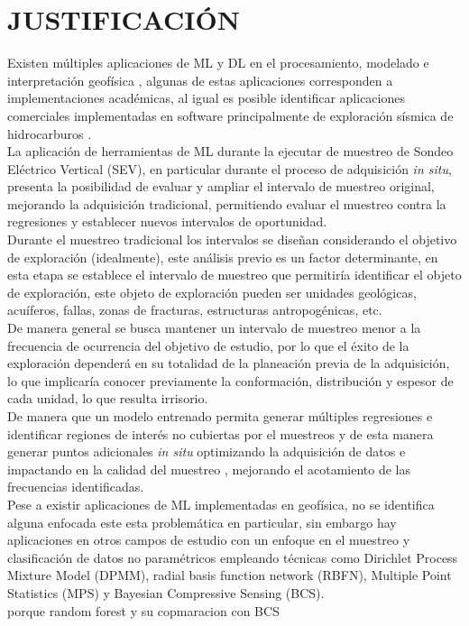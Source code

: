 \chapter{JUSTIFICACIÓN}
Existen múltiples aplicaciones de ML y DL en el procesamiento, modelado e interpretación geofísica \citep{li2024, liu2020,el2001,wrona2018}, algunas de estas aplicaciones corresponden a implementaciones académicas, al igual es posible identificar aplicaciones comerciales implementadas en software principalmente de exploración sísmica de hidrocarburos \citep{diaferia2024high, panebianco2024automated}.\\



La aplicación de herramientas de ML durante la ejecutar de muestreo de Sondeo Eléctrico Vertical (SEV), en particular durante el proceso de adquisición \textit{in situ}, presenta la posibilidad de evaluar y ampliar el intervalo de muestreo original, mejorando la adquisición tradicional, permitiendo evaluar el muestreo contra la regresiones y establecer nuevos intervalos de oportunidad.\\

Durante el muestreo tradicional los intervalos se diseñan considerando el objetivo de exploración (idealmente), este análisis previo es un factor determinante, en esta etapa se establece el intervalo de muestreo que permitiría identificar el objeto de exploración, este objeto de exploración pueden ser unidades geológicas, acuíferos, fallas, zonas de fracturas, estructuras antropogénicas, etc.\\

De manera general se busca mantener un intervalo de muestreo menor a la frecuencia de ocurrencia del objetivo de estudio, por lo que el éxito de la exploración dependerá en su totalidad de la planeación previa de la adquisición, lo que implicaría conocer previamente la conformación, distribución y espesor de cada unidad, lo que resulta irrisorio.\\

De manera que un modelo entrenado permita generar múltiples regresiones e identificar regiones de interés no cubiertas por el muestreos y de esta manera generar puntos adicionales \textit{in situ} optimizando la adquisición de datos e impactando en la calidad del muestreo , mejorando el acotamiento de las frecuencias identificadas.\\

Pese a existir aplicaciones de ML implementadas en geofísica, no se identifica alguna enfocada este esta problemática en particular, sin embargo hay aplicaciones en otros campos de estudio con un enfoque en el muestreo y clasificación de datos no paramétricos \citep{entezami2022non, bkassiny2013multidimensional, shi2021non} empleando técnicas como Dirichlet Process Mixture Model (DPMM), radial basis function network (RBFN),  Multiple Point Statistics (MPS) y Bayesian Compressive Sensing (BCS).\\


porque random forest y su copmaracion con BCS
